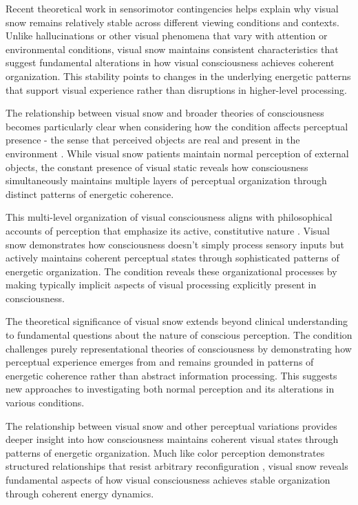Recent theoretical work in sensorimotor contingencies \cite{Seth2014} helps explain why visual snow remains relatively stable across different viewing conditions and contexts. Unlike hallucinations or other visual phenomena that vary with attention or environmental conditions, visual snow maintains consistent characteristics that suggest fundamental alterations in how visual consciousness achieves coherent organization. This stability points to changes in the underlying energetic patterns that support visual experience rather than disruptions in higher-level processing.

The relationship between visual snow and broader theories of consciousness becomes particularly clear when considering how the condition affects perceptual presence - the sense that perceived objects are real and present in the environment \cite{Seth2014}. While visual snow patients maintain normal perception of external objects, the constant presence of visual static reveals how consciousness simultaneously maintains multiple layers of perceptual organization through distinct patterns of energetic coherence.

This multi-level organization of visual consciousness aligns with philosophical accounts of perception that emphasize its active, constitutive nature \cite{Noe2004}. Visual snow demonstrates how consciousness doesn't simply process sensory inputs but actively maintains coherent perceptual states through sophisticated patterns of energetic organization. The condition reveals these organizational processes by making typically implicit aspects of visual processing explicitly present in consciousness.

The theoretical significance of visual snow extends beyond clinical understanding to fundamental questions about the nature of conscious perception. The condition challenges purely representational theories of consciousness \cite{Metzinger2003} by demonstrating how perceptual experience emerges from and remains grounded in patterns of energetic coherence rather than abstract information processing. This suggests new approaches to investigating both normal perception and its alterations in various conditions.

The relationship between visual snow and other perceptual variations provides deeper insight into how consciousness maintains coherent visual states through patterns of energetic organization. Much like color perception demonstrates structured relationships that resist arbitrary reconfiguration \cite{Palmer1999}, visual snow reveals fundamental aspects of how visual consciousness achieves stable organization through coherent energy dynamics.

